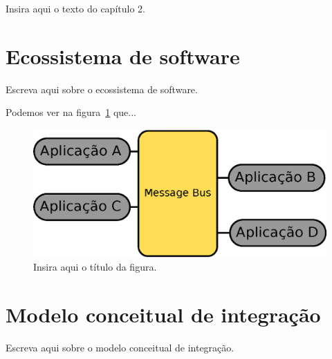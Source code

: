 \label{sec:capitulo02}

Insira aqui o texto do capítulo 2.


\section{Ecossistema de software}

Escreva aqui sobre o ecossistema de software.


Podemos ver na figura~\ref{fig01} que...

\begin{figure}[ht]
  \centering	
	\includegraphics[scale=0.7]{figs/exemplo01.eps}
	\caption{Insira aqui o título da figura.}
	\label{fig01}
\end{figure}


\section{Modelo conceitual de integração}

Escreva aqui sobre o modelo conceitual de integração.